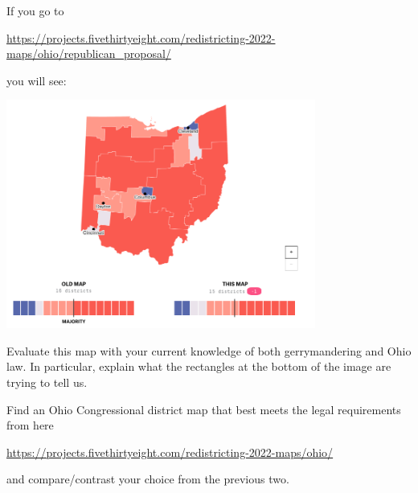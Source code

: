 \documentclass[noauthor,nooutcomes,hints,handout]{ximera}
\begin{document}
\begin{question}
  If you go to
  \begin{center}
  \url{https://projects.fivethirtyeight.com/redistricting-2022-maps/ohio/republican_proposal/}
  \end{center}
  you will see:
  \begin{center}
    \includegraphics[width=4in]{repProp.png}
  \end{center}
  Evaluate this map with your current knowledge of both gerrymandering
  and Ohio law.  In particular, explain what the rectangles at the
  bottom of the image are trying to tell us.
\end{question}



\mynewpage

\begin{question}
  Find an Ohio Congressional district map that best meets the legal
  requirements from here
  \begin{center}
    \url{https://projects.fivethirtyeight.com/redistricting-2022-maps/ohio/}
  \end{center}
  and compare/contrast your choice from the previous two.
\end{question}
\end{document}

